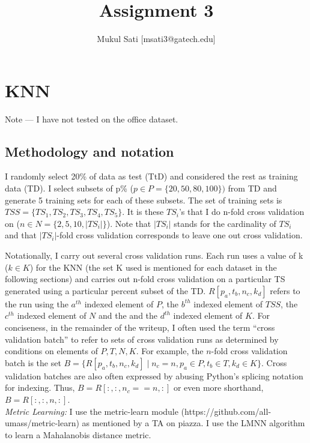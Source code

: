 \documentclass[5pt]{article}
\begin{document}
\title{Assignment 3}
\author{Mukul Sati [msati3@gatech.edu]}
\maketitle

\section{KNN}

Note --- I have not tested on the office dataset.
\subsection{Methodology and notation}

I randomly select 20\% of data as test (TtD) and considered the rest as
training data (TD). I select subsets of p\% ($p \in P =\{20, 50, 80, 100\})$
from TD and generate 5 training sets for each of these subsets. The set of
training sets is $TSS = \{TS_1, TS_2, TS_3, TS_4, TS_5\}$. It is these $TS_i$'s
that I do n-fold cross validation on ($n \in N =\{2, 5, 10, |TS_i|\}$). Note
that $|TS_i|$ stands for the cardinality of $TS_i$ and that $|TS_i|$-fold cross
validation corresponds to leave one out cross validation.

Notationally, I carry out several cross validation runs. Each run uses a value
of k ($k \in K$) for the KNN (the set K used is mentioned for each dataset in
the following sections) and carries out n-fold cross validation on a particular
TS generated using a particular percent subset of the TD\@.
$R[p_a,t_b,n_c,k_d]$ refers to the run using the $a^{th}$ indexed element of
$P$, the $b^{th}$ indexed element of $TSS$, the $c^{th}$ indexed element of $N$
and the and the $d^{th}$ indexed element of $K$. For conciseness, in the
remainder of the writeup, I often used the term ``cross validation batch'' to
refer to sets of cross validation runs as determined by conditions on elements
of $P, T, N, K$. For example, the $n$-fold cross validation batch is the set $B
= \{R[p_a,t_b,n_c,k_d] \mid n_c=n, p_a \in P, t_b \in T, k_d \in K\}$. Cross
validation batches are also often expressed by abusing Python's splicing
notation for indexing. Thus, $B = R[:,:,n_c==n,:]$ or even more shorthand, $B =
R[:,:,n,:]$.\\

\noindent \emph{Metric Learning:} I use the metric-learn module
(https://github.com/all-umass/metric-learn) as mentioned by a TA on piazza. I
use the LMNN algorithm to learn a Mahalanobis distance metric.\\
\end{document}
